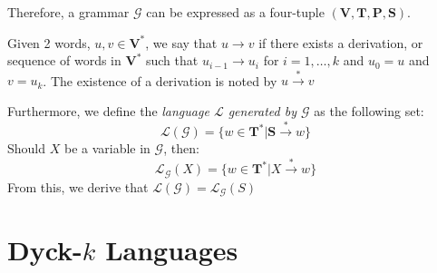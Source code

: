 Therefore, a grammar $\mathcal{G}$ can be expressed as a four-tuple $(\mathbf{V}, \mathbf{T}, \mathbf{P}, \mathbf{S})$. 

Given 2 words, $u, v \in \mathbf{V}^*$, we say that $u \rightarrow v$ if there exists a derivation, or sequence of words in $\mathbf{V}^*$ such that $u_{i-1} \rightarrow u_{i}$ for $i = 1,\dots,k$ and $u_0=u$ and $v=u_k$. The existence of a derivation is noted by $u \xrightarrow{*} v$

Furthermore, we define the \emph{language $\mathcal{L}$ generated by $\mathcal{G}$} as the following set:
$$
\mathcal{L}(\mathcal{G}) = \{w \in \mathbf{T}^* | \mathbf{S} \xrightarrow{*} w \}
$$
Should $X$ be a variable in $\mathcal{G}$, then:
$$
\mathcal{L}_{\mathcal{G}}(X) = \{ w \in \mathbf{T}^* | X \xrightarrow{*} w\}
$$
From this, we derive that $\mathcal{L}(\mathcal{G}) = \mathcal{L}_{\mathcal{G}}(S)$

\section{Dyck-$k$ Languages}